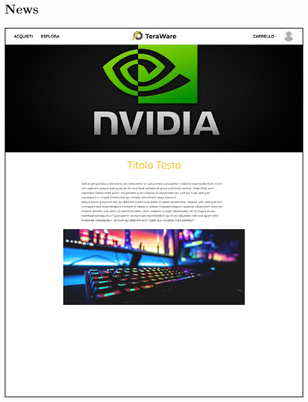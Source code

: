 \documentclass{article}
\begin{document}
\begin{large}
        \subsection{News}
            \begin{center}
                \includegraphics[scale=0.29]{teraware/_layoutnews.png}
            \end{center}

\end{large}
\end{document}
